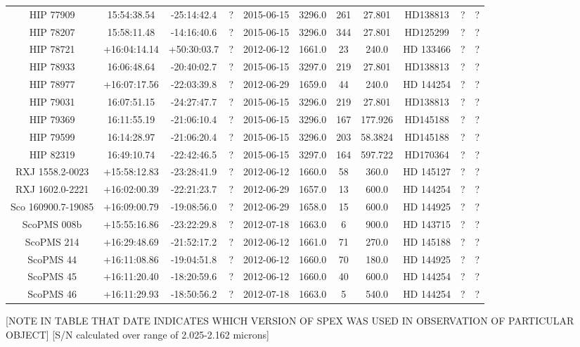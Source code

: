 \begin{table}
\begin{tabular}{ccccccccccc}
HIP 77909 & 15:54:38.54 & -25:14:42.4 & ? & 2015-06-15 & 3296.0 & 261 & 27.801 & HD138813 & ? & ? \\
HIP 78207 & 15:58:11.48 & -14:16:40.6 & ? & 2015-06-15 & 3296.0 & 344 & 27.801 & HD125299 & ? & ? \\
HIP 78721 & +16:04:14.14 & +50:30:03.7 & ? & 2012-06-12 & 1661.0 & 23 & 240.0 & HD 133466 & ? & ? \\
HIP 78933 & 16:06:48.64 & -20:40:02.7 & ? & 2015-06-15 & 3297.0 & 219 & 27.801 & HD138813 & ? & ? \\
HIP 78977 & +16:07:17.56 & -22:03:39.8 & ? & 2012-06-29 & 1659.0 & 44 & 240.0 & HD 144254 & ? & ? \\
HIP 79031 & 16:07:51.15 & -24:27:47.7 & ? & 2015-06-15 & 3296.0 & 219 & 27.801 & HD138813 & ? & ? \\
HIP 79369 & 16:11:55.19 & -21:06:10.4 & ? & 2015-06-15 & 3296.0 & 167 & 177.926 & HD145188 & ? & ? \\
HIP 79599 & 16:14:28.97 & -21:06:20.4 & ? & 2015-06-15 & 3296.0 & 203 & 58.3824 & HD145188 & ? & ? \\
HIP 82319 & 16:49:10.74 & -22:42:46.5 & ? & 2015-06-15 & 3297.0 & 164 & 597.722 & HD170364 & ? & ? \\
RXJ 1558.2-0023 & +15:58:12.83 & -23:28:41.9 & ? & 2012-06-12 & 1660.0 & 58 & 360.0 & HD 145127 & ? & ? \\
RXJ 1602.0-2221 & +16:02:00.39 & -22:21:23.7 & ? & 2012-06-29 & 1657.0 & 13 & 600.0 & HD 144254 & ? & ? \\
Sco 160900.7-19085 & +16:09:00.79 & -19:08:56.0 & ? & 2012-06-29 & 1658.0 & 15 & 600.0 & HD 144925 & ? & ? \\
ScoPMS 008b & +15:55:16.86 & -23:22:29.8 & ? & 2012-07-18 & 1663.0 & 6 & 900.0 & HD 143715 & ? & ? \\
ScoPMS 214 & +16:29:48.69 & -21:52:17.2 & ? & 2012-06-12 & 1661.0 & 71 & 270.0 & HD 145188 & ? & ? \\
ScoPMS 44 & +16:11:08.86 & -19:04:51.8 & ? & 2012-06-12 & 1660.0 & 70 & 180.0 & HD 144925 & ? & ? \\
ScoPMS 45 & +16:11:20.40 & -18:20:59.6 & ? & 2012-06-12 & 1660.0 & 40 & 600.0 & HD 144254 & ? & ? \\
ScoPMS 46 & +16:11:29.93 & -18:50:56.2 & ? & 2012-07-18 & 1663.0 & 5 & 540.0 & HD 144254 & ? & ? \\
\end{tabular}
\end{table}


  [NOTE IN TABLE THAT DATE INDICATES WHICH VERSION OF SPEX WAS USED IN OBSERVATION OF PARTICULAR OBJECT]
  [S/N calculated over range of 2.025-2.162 microns]

